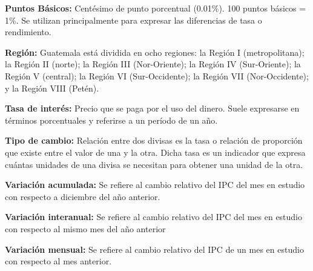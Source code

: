 {\textbf{Puntos Básicos:} Centésimo de punto porcentual (0.01\%). 100 puntos básicos = 1\%. Se utilizan principalmente para expresar las diferencias de tasa o rendimiento.

\textbf{Región:} Guatemala está dividida en ocho regiones: la Región I (metropolitana); la Región II (norte); la Región III (Nor-Oriente); la Región IV (Sur-Oriente); la Región V (central); la Región VI (Sur-Occidente); la Región VII (Nor-Occidente); y la Región VIII (Petén).

\textbf{Tasa de interés:} Precio que se paga por el uso del dinero. Suele expresarse en términos porcentuales y referirse a un período de un año.

\textbf{Tipo de cambio:} Relación entre dos divisas es la tasa o relación de proporción que existe entre el valor de una y la otra. Dicha tasa es un indicador que expresa cuántas unidades de una divisa se necesitan para obtener una unidad de la otra.

\textbf{Variación acumulada:} Se refiere al cambio relativo del IPC del mes en estudio con respecto a diciembre del año anterior.

\textbf{Variación interanual:} Se refiere al cambio relativo del IPC del mes en estudio con respecto al mismo mes del año anterior

\textbf{Variación mensual:} Se refiere al cambio relativo del IPC de un mes en estudio con respecto al mes anterior.
}